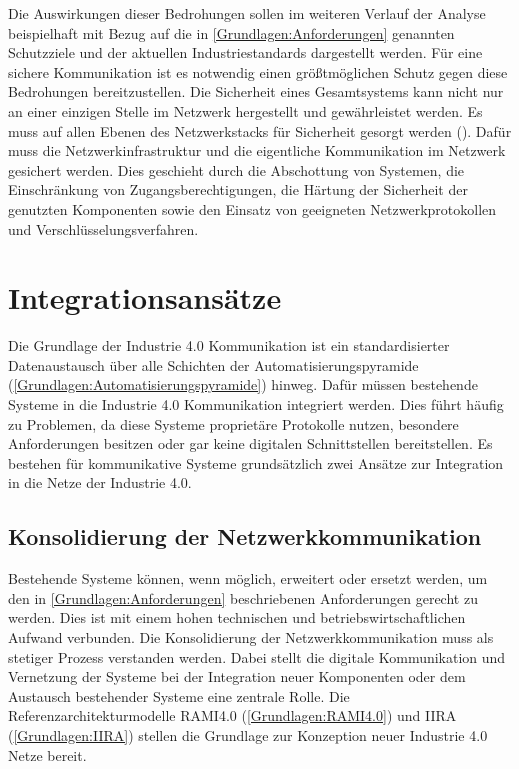 Die Auswirkungen dieser Bedrohungen sollen im weiteren Verlauf der Analyse beispielhaft mit Bezug auf die in \autoref{Grundlagen:Anforderungen} genannten Schutzziele und der aktuellen Industriestandards dargestellt werden. Für eine sichere Kommunikation ist es notwendig einen größtmöglichen Schutz gegen diese Bedrohungen bereitzustellen. Die Sicherheit eines Gesamtsystems kann nicht nur an einer einzigen Stelle im Netzwerk hergestellt und gewährleistet werden. Es muss auf allen Ebenen des Netzwerkstacks für Sicherheit gesorgt werden (\cite{sichKom2017}). Dafür muss die Netzwerkinfrastruktur und die eigentliche Kommunikation im Netzwerk gesichert werden. Dies geschieht durch die Abschottung von Systemen, die Einschränkung von Zugangsberechtigungen, die Härtung der Sicherheit der genutzten Komponenten sowie den Einsatz von geeigneten Netzwerkprotokollen und Verschlüsselungsverfahren.

\section{Integrationsansätze}
Die Grundlage der Industrie 4.0 Kommunikation ist ein standardisierter Datenaustausch über alle Schichten der Automatisierungspyramide (\autoref{Grundlagen:Automatisierungspyramide}) hinweg. Dafür müssen bestehende Systeme in die Industrie 4.0 Kommunikation integriert werden. Dies führt häufig zu Problemen, da diese Systeme proprietäre Protokolle nutzen, besondere Anforderungen besitzen oder gar keine digitalen Schnittstellen bereitstellen. Es bestehen für kommunikative Systeme grundsätzlich zwei Ansätze zur Integration in die Netze der Industrie 4.0.

\subsection{Konsolidierung der Netzwerkkommunikation}
Bestehende Systeme können, wenn möglich, erweitert oder ersetzt werden, um den in \autoref{Grundlagen:Anforderungen} beschriebenen Anforderungen gerecht zu werden. Dies ist mit einem hohen technischen und betriebswirtschaftlichen Aufwand verbunden. Die Konsolidierung der Netzwerkkommunikation muss als stetiger Prozess verstanden werden. Dabei stellt die digitale Kommunikation und Vernetzung der Systeme bei der Integration neuer Komponenten oder dem Austausch bestehender Systeme eine zentrale Rolle. Die Referenzarchitekturmodelle \ac{RAMI4.0} (\autoref{Grundlagen:RAMI4.0}) und \ac{IIRA} (\autoref{Grundlagen:IIRA}) stellen die Grundlage zur Konzeption neuer Industrie 4.0 Netze bereit.

